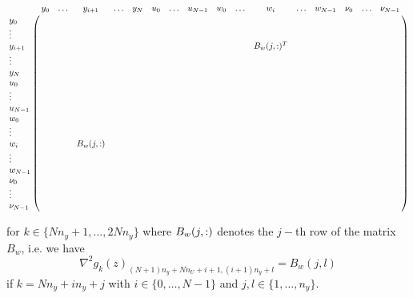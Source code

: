 \documentclass[
12pt, %
a4paper, %
onecolumn, %
portrait %
]{article}
\begin{document}
\begin{tiny}
\begin{equation}
\bordermatrix{
              & y_0 & \hdots & y_{i+1} & \hdots & y_N & u_0 & \hdots & u_{N-1} & w_0 & \hdots & w_i & \hdots & w_{N-1} & \nu_0 & \hdots & \nu_{N-1} \cr
y_0           &     &        &         &        &     &     &        &         &     &        &     &        &         &       &        &           \cr
\vdots        &     &        &         &        &     &     &        &         &     &        &     &        &         &       &        &           \cr
y_{i+1}       &     &        &         &        &     &     &        &         &     &        & \Bwt&        &         &       &        &           \cr
\vdots        &     &        &         &        &     &     &        &         &     &        &     &        &         &       &        &           \cr
y_N           &     &        &         &        &     &     &        &         &     &        &     &        &         &       &        &           \cr
u_0           &     &        &         &        &     &     &        &         &     &        &     &        &         &       &        &           \cr
\vdots        &     &        &         &        &     &     &        &         &     &        &     &        &         &       &        &           \cr
u_{N-1}       &     &        &         &        &     &     &        &         &     &        &     &        &         &       &        &           \cr
w_0           &     &        &         &        &     &     &        &         &     &        &     &        &         &       &        &           \cr
\vdots        &     &        &         &        &     &     &        &         &     &        &     &        &         &       &        &           \cr
w_i           &     &        &    \Bw  &        &     &     &        &         &     &        &     &        &         &       &        &           \cr
\vdots        &     &        &         &        &     &     &        &         &     &        &     &        &         &       &        &           \cr
w_{N-1}       &     &        &         &        &     &     &        &         &     &        &     &        &         &       &        &           \cr
\nu_0         &     &        &         &        &     &     &        &         &     &        &     &        &         &       &        &           \cr
\vdots        &     &        &         &        &     &     &        &         &     &        &     &        &         &       &        &           \cr
\nu_{N-1}     &     &        &         &        &     &     &        &         &     &        &     &        &         &       &        &           \cr
}
\end{equation}
\end{tiny}
for $k \in \{N n_y + 1, \hdots, 2 N n_y\}$ where $B_w(j,:)$ denotes the $j-$th row of the matrix $B_w$, i.e.
we have 
\begin{equation}
\nabla^2 g_{k}(z)_{(N+1)n_y+N n_U+i+1,(i+1) n_y + l} = B_w(j,l)
\end{equation}
if $k = N n_y + i n_y + j$ with $i \in \{0, \hdots, N-1\}$ and $j,l \in \{1, \hdots, n_y\}$.
\end{document}
